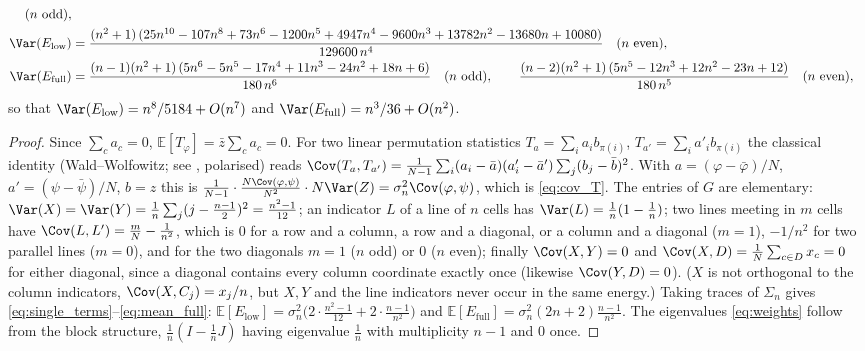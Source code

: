 \begin{proposition}
\begin{align}
\quad(n\ \text{odd}),\nonumber\\
\Var(E_{\mathrm{low}}) &=
\frac{(n^2+1)\,(25n^{10}-107n^{8}+73n^{6}-1200n^{5}+4947n^{4}-9600n^{3}+13782n^{2}-13680n+10080)}{129600\,n^{4}}
\quad(n\ \text{even}),\label{eq:var_low}\\
\Var(E_{\mathrm{full}}) &=
\frac{(n-1)(n^2+1)\,(5n^{6}-5n^{5}-17n^{4}+11n^{3}-24n^{2}+18n+6)}{180\,n^{6}}\quad(n\ \text{odd}),\qquad
\frac{(n-2)(n^2+1)\,(5n^{5}-12n^{3}+12n^{2}-23n+12)}{180\,n^{5}}\quad(n\ \text{even}),\label{eq:var_full}
\end{align}
so that $\Var(E_{\mathrm{low}})=n^8/5184+O(n^7)$ and $\Var(E_{\mathrm{full}})=n^3/36+O(n^2)$.
\end{proposition}

\begin{proof}
Since $\sum_c a_c=0$, $\mathbb{E}[T_\varphi]=\bar z\sum_c a_c=0$. For two linear permutation
statistics $T_a=\sum_i a_i b_{\pi(i)}$, $T_{a'}=\sum_i a'_i b_{\pi(i)}$ the classical identity
(Wald--Wolfowitz; see \cite{hoeffding1951}, polarised) reads
$\Cov(T_a,T_{a'})=\frac{1}{N-1}\sum_i(a_i-\bar a)(a'_i-\bar a')\sum_j(b_j-\bar b)^2$.
With $a=(\varphi-\bar\varphi)/N$, $a'=(\psi-\bar\psi)/N$, $b=z$ this is
$\frac{1}{N-1}\cdot\frac{N\Cov(\varphi,\psi)}{N^2}\cdot N\Var(Z)=\sigma_n^2\Cov(\varphi,\psi)$,
which is \eqref{eq:cov_T}. The entries of $G$ are elementary:
$\Var(X)=\Var(Y)=\frac{1}{n}\sum_{j}(j-\tfrac{n-1}{2})^2=\frac{n^2-1}{12}$; an indicator $L$ of a
line of $n$ cells has $\Var(L)=\frac1n(1-\frac1n)$; two lines meeting in $m$ cells have
$\Cov(L,L')=\frac{m}{N}-\frac{1}{n^2}$, which is $0$ for a row and a column, a row and a diagonal,
or a column and a diagonal ($m=1$), $-1/n^2$ for two parallel lines ($m=0$), and for the two
diagonals $m=1$ ($n$ odd) or $0$ ($n$ even); finally $\Cov(X,Y)=0$ and
$\Cov(X,D)=\frac1N\sum_{c\in D}x_c=0$ for either diagonal, since a diagonal contains every column
coordinate exactly once (likewise $\Cov(Y,D)=0$). ($X$ is not orthogonal to the column
indicators, $\Cov(X,C_j)=x_j/n$, but $X,Y$ and the line indicators never occur in the same energy.)
Taking traces of $\Sigma_n$ gives \eqref{eq:single_terms}--\eqref{eq:mean_full}:
$\mathbb{E}[E_{\mathrm{low}}]=\sigma_n^2\big(2\cdot\frac{n^2-1}{12}+2\cdot\frac{n-1}{n^2}\big)$ and
$\mathbb{E}[E_{\mathrm{full}}]=\sigma_n^2(2n+2)\frac{n-1}{n^2}$. The eigenvalues
\eqref{eq:weights} follow from the block structure, $\tfrac1n(I-\tfrac1nJ)$ having eigenvalue
$\tfrac1n$ with multiplicity $n-1$ and $0$ once.


\end{proof}
